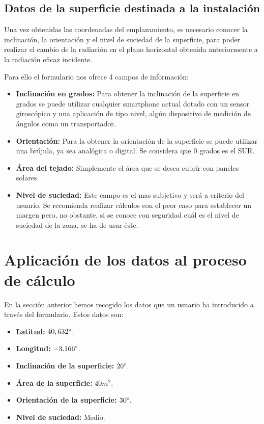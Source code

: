 \subsection{Datos de la superficie destinada a la instalación}

Una vez obtenidas las coordenadas del emplazamiento, es necesario conocer la inclinación, la orientación y el nivel de suciedad de la superficie, para poder realizar el cambio de la radiación en el plano horizontal obtenida anteriormente a la radiación eficaz incidente.

Para ello el formulario nos ofrece 4 campos de información:

\begin{itemize}
\item \textbf{Inclinación en grados:} Para obtener la inclinación de la superficie en grados se puede utilizar cualquier smartphone actual dotado con un sensor giroscópico y una aplicación de tipo nivel, algún dispositivo de medición de ángulos como un transportador.
\item \textbf{Orientación:} Para la obtener la orientación de la superficie se puede utilizar una brújula, ya sea analógica o digital. Se considera que 0 grados es el SUR.
\item \textbf{Área del tejado:} Simplemente el área que se desea cubrir con paneles solares.
\item \textbf{Nivel de suciedad:} Este campo es el mas subjetivo y será a criterio del usuario. Se recomienda realizar cálculos con el peor caso para establecer un margen pero, no obstante, si se conoce con seguridad cuál es el nivel de suciedad de la zona, se ha de usar éste.
\end{itemize}

\section {Aplicación de los datos al proceso de cálculo}

En la sección anterior hemos recogido los datos que un usuario ha introducido a través del formulario. Estos datos son:
\begin{itemize}
\item \textbf{Latitud:} $40,632 \degree$.
\item \textbf{Longitud:} $-3.166 \degree$.
\item \textbf{Inclinación de la superficie:} $20 \degree$.
\item \textbf{Área de la superficie:} $40 m^2 $.
\item \textbf{Orientación de la superficie:} $30 \degree$.
\item \textbf{Nivel de suciedad:} Medio.
\end{itemize}

